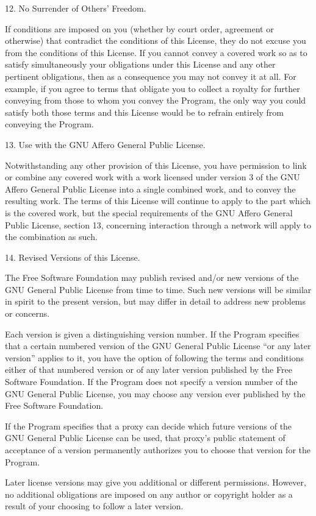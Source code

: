 \documentclass[letterpaper,12pt]{article}
\begin{document}
{12. No Surrender of Others' Freedom.

If conditions are imposed on you (whether by court order, agreement or otherwise) that contradict the conditions of this License, they do not excuse you from the conditions of this License. If you cannot convey a covered work so as to satisfy simultaneously your obligations under this License and any other pertinent obligations, then as a consequence you may not convey it at all. For example, if you agree to terms that obligate you to collect a royalty for further conveying from those to whom you convey the Program, the only way you could satisfy both those terms and this License would be to refrain entirely from conveying the Program.

13. Use with the GNU Affero General Public License.

Notwithstanding any other provision of this License, you have permission to link or combine any covered work with a work licensed under version 3 of the GNU Affero General Public License into a single combined work, and to convey the resulting work. The terms of this License will continue to apply to the part which is the covered work, but the special requirements of the GNU Affero General Public License, section 13, concerning interaction through a network will apply to the combination as such.

14. Revised Versions of this License.

The Free Software Foundation may publish revised and/or new versions of the GNU General Public License from time to time. Such new versions will be similar in spirit to the present version, but may differ in detail to address new problems or concerns.

Each version is given a distinguishing version number. If the Program specifies that a certain numbered version of the GNU General Public License ``or any later version'' applies to it, you have the option of following the terms and conditions either of that numbered version or of any later version published by the Free Software Foundation. If the Program does not specify a version number of the GNU General Public License, you may choose any version ever published by the Free Software Foundation.

If the Program specifies that a proxy can decide which future versions of the GNU General Public License can be used, that proxy's public statement of acceptance of a version permanently authorizes you to choose that version for the Program.

Later license versions may give you additional or different permissions. However, no additional obligations are imposed on any author or copyright holder as a result of your choosing to follow a later version.

}
\end{document}
